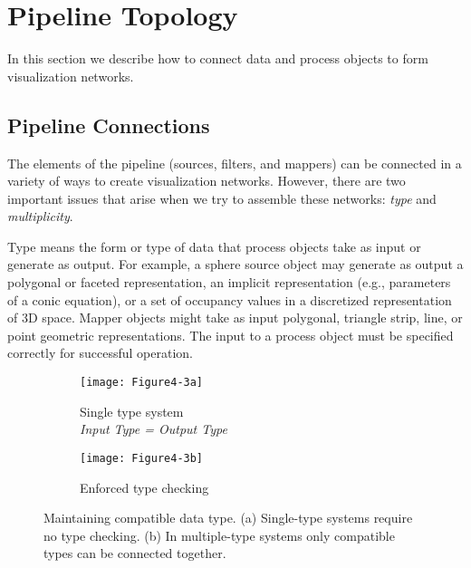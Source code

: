\section{Pipeline Topology}
\label{sec:pipeline_topology}

In this section we describe how to connect data and process objects to form visualization networks.

\subsection{Pipeline Connections}
\label{subsec:pipeline_connections}

The elements of the pipeline (sources, filters, and mappers) can be connected in a variety of ways to create visualization networks. However, there are two important issues that arise when we try to assemble these networks: \emph{type} and \emph{multiplicity}.

Type means the form or type of data that process objects take as input or generate as output. For example, a sphere source object may generate as output a polygonal or faceted representation, an implicit representation (e.g., parameters of a conic equation), or a set of occupancy values in a discretized representation of 3D space. Mapper objects might take as input polygonal, triangle strip, line, or point geometric representations. The input to a process object must be specified correctly for successful operation.

\begin{figure}[htb]
    \centering
	\begin{subfigure}[h]{0.48\linewidth}
        \centering
		\texttt{[image: Figure4-3a]}
		\captionsetup{justification=centering}
		\caption{Single type system \\ \emph{Input Type = Output Type}} 
		\label{fig:Figure4-3a}
	\end{subfigure}
	\hfill
	\begin{subfigure}[h]{0.48\linewidth}
		\texttt{[image: Figure4-3b]}
		\captionsetup{justification=centering}
		\caption{Enforced type checking}
		\label{fig:Figure4-3b}
	\end{subfigure}
	\caption{Maintaining compatible data type. (a) Single-type systems require no type checking. (b) In multiple-type systems only compatible types can be connected together.}\label{fig:Figure4-3}
\end{figure}

